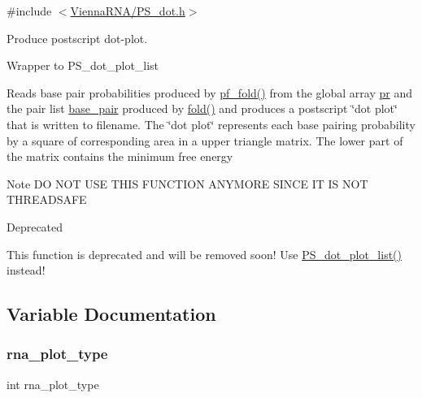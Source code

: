 {\ttfamily \#include $<$\mbox{\hyperlink{_p_s__dot_8h}{Vienna\+R\+N\+A/\+P\+S\+\_\+dot.\+h}}$>$}



Produce postscript dot-\/plot. 

Wrapper to P\+S\+\_\+dot\+\_\+plot\+\_\+list

Reads base pair probabilities produced by \mbox{\hyperlink{group__pf__fold_gadc3db3d98742427e7001a7fd36ef28c2}{pf\+\_\+fold()}} from the global array \mbox{\hyperlink{fold__vars_8h_ac98ec419070aee6831b44e5c700f090f}{pr}} and the pair list \mbox{\hyperlink{fold__vars_8h_a0244a629b5ab4f58b77590c3dfd130dc}{base\+\_\+pair}} produced by \mbox{\hyperlink{group__mfe__fold__single_gaadafcb0f140795ae62e5ca027e335a9b}{fold()}} and produces a postscript \char`\"{}dot plot\char`\"{} that is written to \textquotesingle{}filename\textquotesingle{}. The \char`\"{}dot plot\char`\"{} represents each base pairing probability by a square of corresponding area in a upper triangle matrix. The lower part of the matrix contains the minimum free energy \begin{DoxyNote}{Note}
DO N\+OT U\+SE T\+H\+IS F\+U\+N\+C\+T\+I\+ON A\+N\+Y\+M\+O\+RE S\+I\+N\+CE IT IS N\+OT T\+H\+R\+E\+A\+D\+S\+A\+FE
\end{DoxyNote}
\begin{DoxyRefDesc}{Deprecated}
\item[\mbox{\hyperlink{deprecated__deprecated000131}{Deprecated}}]This function is deprecated and will be removed soon! Use \mbox{\hyperlink{group__plotting__utils_ga00ea223b5cf02eb2faae5ff29f0d5e12}{P\+S\+\_\+dot\+\_\+plot\+\_\+list()}} instead! \end{DoxyRefDesc}


\subsection{Variable Documentation}
\mbox{\label{group__plotting__utils_ga5964c4581431b098b80027d6e14dcdd4}} 
\subsubsection{\texorpdfstring{rna\+\_\+plot\+\_\+type}{rna\_plot\_type}}
{\footnotesize\ttfamily int rna\+\_\+plot\+\_\+type}



